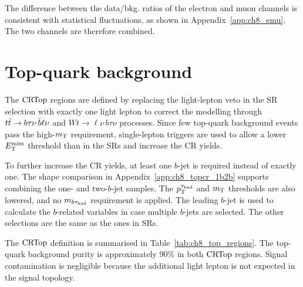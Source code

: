 The difference between the data/bkg. ratios of the electron and muon channels is consistent with statistical fluctuations, as shown in Appendix~\ref{app:ch8_emu}.
The two channels are therefore combined.


\clearpage

\section[Top-quark background]{Top-quark background}
\label{sec:ch8_top}

The $\mathrm{CRTop}$ regions are defined by replacing the light-lepton veto in the SR selection with exactly one light lepton to correct the modelling through $t\bar{t}\to b\tau\nu\,\bar b\ell\nu$ and $Wt\to\ell\nu\,b\tau\nu$ processes.
Since few top-quark background events pass the high-$m_{\mathrm{T}}$ requirement, single-lepton triggers are used to allow a lower $E_{\mathrm{T}}^{\mathrm{miss}}$ threshold than in the SRs and increase the CR yields.

To further increase the CR yields, at least one $b$-jet is required instead of exactly one. The shape comparison in Appendix~\ref{app:ch8_topcr_1b2b} supports combining the one- and two-$b$-jet samples. The $p_{\mathrm{T}}^{\tau_{\mathrm{had}}}$ and $m_{\mathrm{T}}$ thresholds are also lowered, and no $m_{b\tau_{\mathrm{had}}}$ requirement is applied.
The leading $b$-jet is used to calculate the $b$-related variables in case multiple $b$-jets are selected.
The other selections are the same as the ones in SRs.

The $\mathrm{CRTop}$ definition is summarised in Table~\ref{tab:ch8_top_regions}.
The top-quark background purity is approximately $90\%$ in both $\mathrm{CRTop}$ regions.
Signal contamination is negligible because the additional light lepton is not expected in the signal topology.

